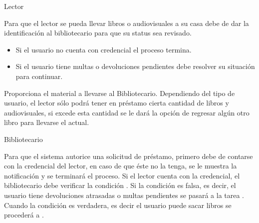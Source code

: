 \begin{PDescripcion}

  \Ppaso Lector

    \begin{enumerate}

      \Ppaso[\itarea]  Para que el lector se pueda llevar libros o audiovisuales a su casa debe de dar la identificación al bibliotecario para que su status sea revisado.
	\begin{itemize}
	  \item Si el usuario no cuenta con credencial el proceso termina.
	  \item Si el usuario tiene multas o devoluciones pendientes debe resolver su situación para continuar.
	\end{itemize}

      \Ppaso[\itarea]  Proporciona el material a llevarse al Bibliotecario. Dependiendo del tipo de usuario, el lector sólo podrá tener en préstamo cierta cantidad de libros y audiovisuales, si excede esta cantidad se le dará la opción de regresar algún otro libro para llevarse el actual.

    \end{enumerate}

  \Ppaso Bibliotecario

    \begin{enumerate}

      \Ppaso[\itarea]  Para que el sistema autorice una solicitud de préstamo, primero debe de contarse con la credencial del lector, en caso de que éste no la tenga, se le muestra la notificación   y se terminará el proceso. 
Si el lector cuenta con la credencial, el bibliotecario debe verificar la condición . Si la condición es falsa, es decir, el usuario tiene devoluciones atrasadas o multas pendientes se pasará a la tarea   . Cuando la condición es verdadera, es decir el usuario puede sacar libros se procederá a . 


\end{enumerate}
\end{PDescripcion}
